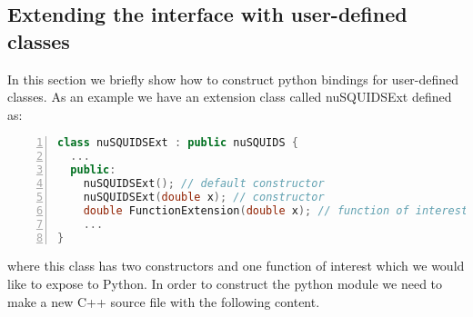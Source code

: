 \documentclass[3p,12pt]{elsarticle}
\newcommand{\ttf}{\ttfamily}
\begin{document}
\subsection{Extending the interface with user-defined classes~\label{sec:python_extensions}}

In this section we briefly show how to construct python bindings for user-defined classes. As an example
we have an extension class called {\ttf nuSQUIDSExt} defined as:

\begin{lstlisting}[language=C++, frame=leftline, numbers=left, breaklines=true]
class nuSQUIDSExt : public nuSQUIDS {
  ...
  public:
    nuSQUIDSExt(); // default constructor
    nuSQUIDSExt(double x); // constructor
    double FunctionExtension(double x); // function of interest
    ...
}
\end{lstlisting}
where this class has two constructors and one function of interest which we would like to expose to {\ttf Python}.
In order to construct the python module we need to make a new C++ source file with the following content.
\end{document}
